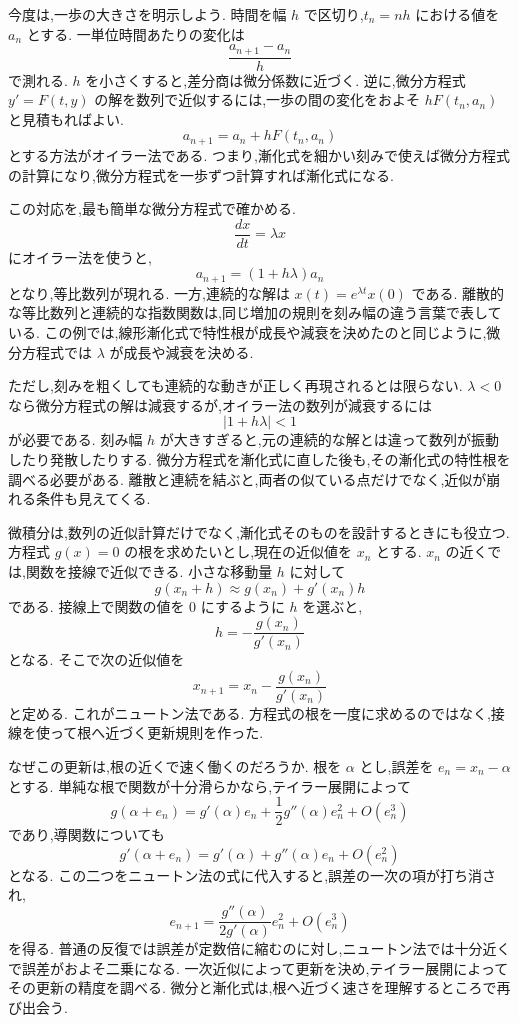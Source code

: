 今度は,一歩の大きさを明示しよう.
時間を幅 $h$ で区切り,$t_n=nh$ における値を $a_n$ とする.
一単位時間あたりの変化は
\[
  \frac{a_{n+1}-a_n}{h}
\]
で測れる.
$h$ を小さくすると,差分商は微分係数に近づく.
逆に,微分方程式 $y'=F(t,y)$ の解を数列で近似するには,一歩の間の変化をおよそ $hF(t_n,a_n)$ と見積もればよい.
\[
  a_{n+1}=a_n+hF(t_n,a_n)
\]
とする方法がオイラー法である.
つまり,漸化式を細かい刻みで使えば微分方程式の計算になり,微分方程式を一歩ずつ計算すれば漸化式になる.

この対応を,最も簡単な微分方程式で確かめる.
\[
  \frac{dx}{dt}=\lambda x
\]
にオイラー法を使うと,
\[
  a_{n+1}=(1+h\lambda)a_n
\]
となり,等比数列が現れる.
一方,連続的な解は $x(t)=e^{\lambda t}x(0)$ である.
離散的な等比数列と連続的な指数関数は,同じ増加の規則を刻み幅の違う言葉で表している.
この例では,線形漸化式で特性根が成長や減衰を決めたのと同じように,微分方程式では $\lambda$ が成長や減衰を決める.

ただし,刻みを粗くしても連続的な動きが正しく再現されるとは限らない.
$\lambda<0$ なら微分方程式の解は減衰するが,オイラー法の数列が減衰するには
\[
  |1+h\lambda|<1
\]
が必要である.
刻み幅 $h$ が大きすぎると,元の連続的な解とは違って数列が振動したり発散したりする.
微分方程式を漸化式に直した後も,その漸化式の特性根を調べる必要がある.
離散と連続を結ぶと,両者の似ている点だけでなく,近似が崩れる条件も見えてくる.

微積分は,数列の近似計算だけでなく,漸化式そのものを設計するときにも役立つ.
方程式 $g(x)=0$ の根を求めたいとし,現在の近似値を $x_n$ とする.
$x_n$ の近くでは,関数を接線で近似できる.
小さな移動量 $h$ に対して
\[
  g(x_n+h)\approx g(x_n)+g'(x_n)h
\]
である.
接線上で関数の値を $0$ にするように $h$ を選ぶと,
\[
  h=-\frac{g(x_n)}{g'(x_n)}
\]
となる.
そこで次の近似値を
\[
  x_{n+1}=x_n-\frac{g(x_n)}{g'(x_n)}
\]
と定める.
これがニュートン法である.
方程式の根を一度に求めるのではなく,接線を使って根へ近づく更新規則を作った.

なぜこの更新は,根の近くで速く働くのだろうか.
根を $\alpha$ とし,誤差を $e_n=x_n-\alpha$ とする.
単純な根で関数が十分滑らかなら,テイラー展開によって
\[
  g(\alpha+e_n)
  =g'(\alpha)e_n+\frac12g''(\alpha)e_n^2+O(e_n^3)
\]
であり,導関数についても
\[
  g'(\alpha+e_n)=g'(\alpha)+g''(\alpha)e_n+O(e_n^2)
\]
となる.
この二つをニュートン法の式に代入すると,誤差の一次の項が打ち消され,
\[
  e_{n+1}
  =
  \frac{g''(\alpha)}{2g'(\alpha)}e_n^2
  +O(e_n^3)
\]
を得る.
普通の反復では誤差が定数倍に縮むのに対し,ニュートン法では十分近くで誤差がおよそ二乗になる.
一次近似によって更新を決め,テイラー展開によってその更新の精度を調べる.
微分と漸化式は,根へ近づく速さを理解するところで再び出会う.

